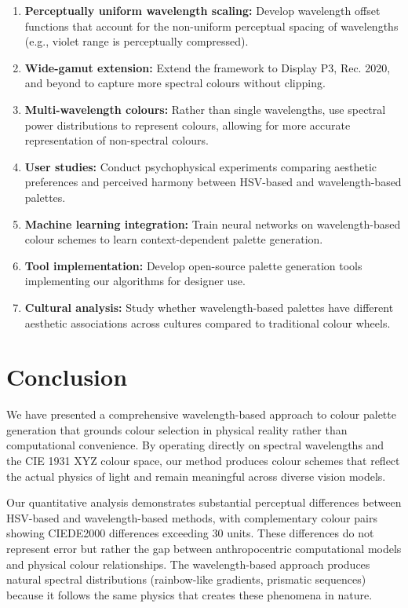 \documentclass[12pt,a4paper]{article}
\begin{document}
\begin{enumerate}
\item \textbf{Perceptually uniform wavelength scaling:} Develop wavelength offset functions that account for the non-uniform perceptual spacing of wavelengths (e.g., violet range is perceptually compressed).

\item \textbf{Wide-gamut extension:} Extend the framework to Display P3, Rec. 2020, and beyond to capture more spectral colours without clipping.

\item \textbf{Multi-wavelength colours:} Rather than single wavelengths, use spectral power distributions to represent colours, allowing for more accurate representation of non-spectral colours.

\item \textbf{User studies:} Conduct psychophysical experiments comparing aesthetic preferences and perceived harmony between HSV-based and wavelength-based palettes.

\item \textbf{Machine learning integration:} Train neural networks on wavelength-based colour schemes to learn context-dependent palette generation.

\item \textbf{Tool implementation:} Develop open-source palette generation tools implementing our algorithms for designer use.

\item \textbf{Cultural analysis:} Study whether wavelength-based palettes have different aesthetic associations across cultures compared to traditional colour wheels.
\end{enumerate}

\section{Conclusion}
\label{sec:conclusion}

We have presented a comprehensive wavelength-based approach to colour palette generation that grounds colour selection in physical reality rather than computational convenience. By operating directly on spectral wavelengths and the CIE 1931 XYZ colour space, our method produces colour schemes that reflect the actual physics of light and remain meaningful across diverse vision models.

Our quantitative analysis demonstrates substantial perceptual differences between HSV-based and wavelength-based methods, with complementary colour pairs showing CIEDE2000 differences exceeding 30 units. These differences do not represent error but rather the gap between anthropocentric computational models and physical colour relationships. The wavelength-based approach produces natural spectral distributions (rainbow-like gradients, prismatic sequences) because it follows the same physics that creates these phenomena in nature.
\end{document}

